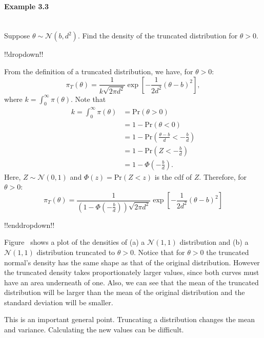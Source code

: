 \paragraph{Example 3.3}{~\\
Suppose $\theta \sim \mathcal{N}(b,d^2)$.
Find the density of the truncated distribution for $\theta>0$.



!!dropdown!!

From the definition of a truncated distribution, we have, for $\theta >0$:
    $$ \pi_T(\theta) = \frac{1}{k \sqrt{2\pi d^2}}\exp\left[-\frac{1}{2d^2}(\theta - b)^2\right], $$
    where $k = \int_0^\infty \pi(\theta).$ Note that 
    \begin{align*}
       k = \int_0^\infty \pi(\theta) &= \text{Pr}(\theta > 0) \\
       &= 1 - \text{Pr}(\theta < 0) \\
       &= 1 - \text{Pr}\left(\frac{\theta - b}{d} < -\frac{b}{d}\right) \\
       &= 1 - \text{Pr}\left(Z < -\frac{b}{d} \right) \\
       &= 1 - \Phi\left(-\frac{b}{d}\right).
    \end{align*}
    Here, $Z \sim \mathcal{N}(0,1)$ and $\Phi(z) = \text{Pr}(Z < z)$ is the cdf of $Z$. Therefore, for $\theta > 0$:
    $$\pi_T(\theta)  = \frac{1}{\left(1 - \Phi\left(-\frac{b}{d}\right)\right) \sqrt{2\pi d^2}}\exp\left[-\frac{1}{2d^2}(\theta - b)^2\right] $$

!!enddropdown!!}

Figure~ shows a plot of the densities of (a) a $\mathcal{N}(1,1)$
distribution and (b) a $\mathcal{N}(1,1)$ distribution truncated to $\theta>0$.
Notice that for $\theta>0$ the truncated normal's density
has the same shape as that of the original distribution.
However the truncated density takes proportionately larger values,
since both curves must have an area underneath of one.
Also, we can see that the mean of the truncated distribution will be larger than the mean of the original distribution and the standard deviation will be smaller.

This is an important general point.
Truncating a distribution changes the mean and variance.
Calculating the new values can be difficult.

